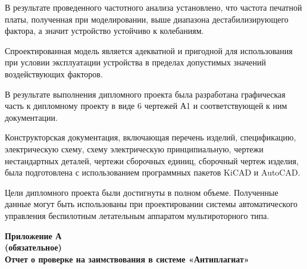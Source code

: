 В результате проведенного частотного анализа установлено, что частота
печатной платы, полученная при моделировании, выше диапазона
дестабилизирующего фактора, а значит устройство устойчиво к
колебаниям.

Спроектированная модель является адекватной и пригодной для
использования при условии эксплуатации устройства в пределах
допустимых значений воздействующих факторов.


В результате выполнения дипломного проекта была разработана
графическая часть к дипломному проекту в виде 6 чертежей А1 и
соответствующей к ним документации.

Конструкторская документация, включающая перечень изделий,
спецификацию, электрическую схему, схему электрическую принципиальную,
чертежи нестандартных деталей, чертежи сборочных единиц, сборочный
чертеж изделия, была подготовлена с использованием программных пакетов
KiCAD и AutoCAD.

Цели дипломного проекта были достигнуты в полном объеме. Полученные
данные могут быть использованы при проектировании системы
автоматического управления беспилотным летательным аппаратом
мультироторного типа.
\newpage

\renewcommand{\refname}{\textbf{Cписок использованных источников}}
\printbibliography[heading=bibintoc, title={Cписок использованных источников}]

\newpage

\captionsetup[table]{
    format=bsuirtable,
    singlelinecheck=false,
    labelsep=endash,
    skip=1mm,
    position=above,
    parindent=0pt, %
    labelformat=empty, %
  }
  
\begin{center}
\textbf{Приложение А}\\
\textbf{(обязательное)}\\
\textbf{Отчет о проверке на заимствования в системе «Антиплагиат»}
\end{center}

